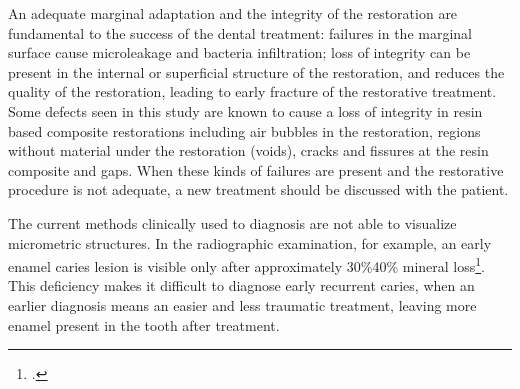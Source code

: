\documentclass[12pt,twoside,english]{book}
\renewcommand{\~}{\perispomeni}%
\numberwithin{equation}{section}
\numberwithin{figure}{section}
\begin{document}
An adequate marginal adaptation and the integrity of the restoration are fundamental to the success of the dental treatment: failures in the marginal surface cause microleakage and bacteria infiltration; loss of integrity can be present in the internal or superficial structure of the restoration, and reduces the quality of the restoration, leading to early fracture of the restorative treatment. Some defects seen in this study are known to cause a loss of integrity in resin based composite restorations including air bubbles in the restoration, regions without material under the restoration (voids), cracks and fissures at the resin composite and gaps. When these kinds of failures are present and the restorative procedure is not adequate, a new treatment should be discussed with the patient.


The current methods clinically used to diagnosis are not able to visualize micrometric structures. In the radiographic examination, for example, an early enamel caries lesion is visible only after approximately 30\%\textendash{}40\% mineral loss\footcite{White:2000p2224}. This deficiency makes it difficult to diagnose early recurrent caries, when an earlier diagnosis means an easier and less traumatic treatment, leaving more enamel present in the tooth after treatment.
\end{document}
